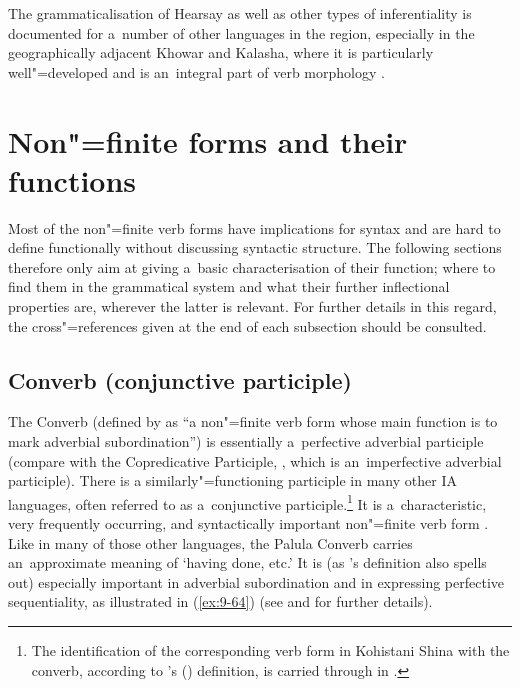 The grammaticalisation of Hearsay as well as other types of inferentiality is documented for a~number of other languages in the region, especially in the geographically adjacent Khowar and Kalasha, where it is particularly well"=developed and is an~integral part of verb morphology \citep{bashir1996}. 


\section{Non"=finite forms and their functions}
\label{sec:9-3}

Most of the non"=finite verb forms have implications for syntax and are hard to define functionally without discussing syntactic structure. The following sections therefore only aim at giving a~basic characterisation of their function; where to find them in the grammatical system and what their further inflectional properties are, wherever the latter is relevant. For further details in this regard, the cross"=references given at the end of each subsection should be consulted. 


\subsection{Converb (conjunctive participle) }
\label{subsec:9-3-1}


The Converb (defined by \citet{haspelmath1995} as ``a non"=finite verb form whose main function is to mark adverbial subordination'') is essentially a~perfective adverbial participle (compare with the Copredicative Participle, , which is an~imperfective adverbial participle). There is a similarly"=functioning participle in many other IA languages, often referred to as a~conjunctive participle.\footnote{The identification of the corresponding verb form in Kohistani Shina with the converb, according to \citeauthor{haspelmath1995}'s (\citeyear{haspelmath1995}) definition, is carried through in \citet{schmidt2003}.} It is  a~characteristic, very frequently occurring, and syntactically important non"=finite verb form \citep[323, 397--401]{masica1991}. Like in many of those other languages, the Palula Converb carries an~approximate meaning of `having done, etc.' It is (as \citeauthor{haspelmath1995}'s definition also spells out) especially important in adverbial subordination and in expressing perfective sequentiality, as illustrated in (\ref{ex:9-64}) (see  and  for further details).

